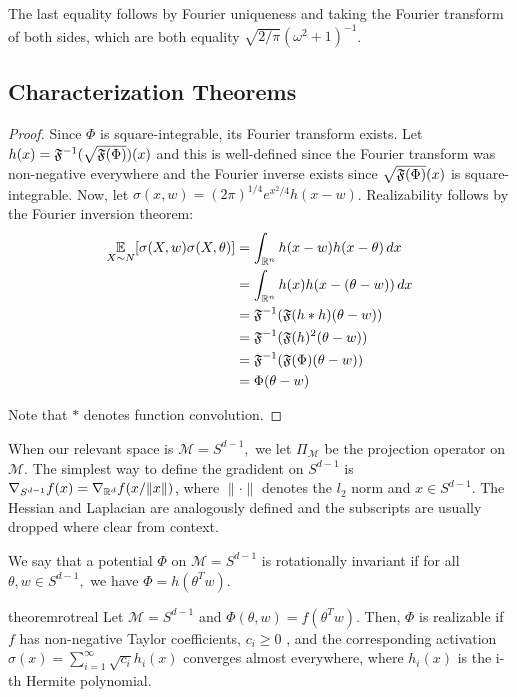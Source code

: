 The last equality follows by Fourier uniqueness and taking the Fourier transform of both sides, which are both equality $\sqrt{2/\pi}(\omega^2+1)^{-1}$. 


\subsection{Characterization Theorems}


\tranreal*

\begin{proof}
Since $\Phi$ is square-integrable, its Fourier transform exists. Let $h(x) = {\mathfrak{F}}^{-1}(\sqrt{{\mathfrak{F}}(\Phi)})(x)$ and this is well-defined since the Fourier transform was non-negative everywhere and the Fourier inverse exists since $\sqrt{{\mathfrak{F}}(\Phi)}(x)$ is square-integrable. Now, let $\sigma(x,w) = (2\pi)^{1/4}e^{x^2/4}h(x-w)$. Realizability follows by the Fourier inversion theorem:
%
\begin{align*}
    \operatorname*{\mathbb{E}}_{X \sim N}[\sigma(X,w)\sigma(X,\theta)]  &= \int_{{\mathbb{R}}^n} h(x-w)h(x-\theta) \, dx \\
    &= \int_{{\mathbb{R}}^n} h(x)h(x-(\theta-w)) \, dx \\
    &= {\mathfrak{F}}^{-1}({\mathfrak{F}}(h\ast h)(\theta -w)) \\
    &= {\mathfrak{F}}^{-1}({\mathfrak{F}}(h)^2(\theta - w)) \\
    &= {\mathfrak{F}}^{-1}({\mathfrak{F}}(\Phi)(\theta - w)) \\
    &= \Phi(\theta - w) 
\end{align*}
 
Note that $\ast$ denotes function convolution.
\end{proof}



When our relevant space is $\mathcal{M} = S^{d-1},$ we let
$\Pi_\mathcal{M}$ be the projection operator on $\mathcal{M}$. The
simplest way to define the gradident on
$S^{d-1}$ is $\nabla_{S^{d-1}} f(x) = \nabla_{{\mathbb{R}}^d} f(x/\|x\|)$, where
$\| \cdot \|$ denotes the $l_2$ norm and $x \in S^{d-1}$. 
The Hessian and Laplacian are analogously defined and the subscripts
are usually dropped where clear from context.

We say that a potential $\Phi$ on $\mathcal{M} = S^{d-1}$ is
rotationally invariant if for all $\theta, w \in S^{d-1},$ we have
 $\Phi = h(\theta^Tw).$
%
\begin{restatable}{theorem}{rotreal}
\label{thm:rotReal}
Let $\mathcal{M} = S^{d-1}$ and $\Phi(\theta,w) = f(\theta^Tw)$. Then,
$\Phi$ is realizable if $f$ has non-negative Taylor coefficients, $c_i
\geq 0$ , and the corresponding activation $\sigma(x) = \sum_{i=1}^\infty \sqrt{c_i} h_i(x)$
converges almost everywhere, where $h_i(x)$ is the i-th Hermite polynomial.
\end{restatable}


